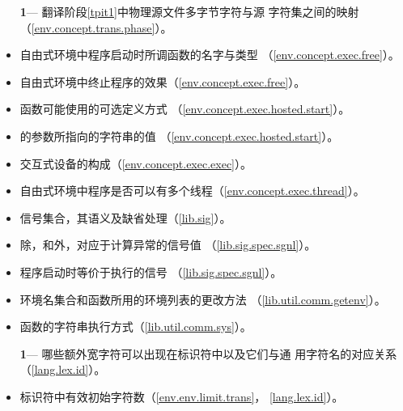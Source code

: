 \begin{itemize} %
  \item[\textbf{1}\hspace{5pt}---]{翻译阶段\ref{tpit1}中物理源文件多字节字符与源
    字符集之间的映射（\ref{env.concept.trans.phase}）。}
  \item{自由式环境中程序启动时所调函数的名字与类型
    （\ref{env.concept.exec.free}）。}
  \item{自由式环境中终止程序的效果（\ref{env.concept.exec.free}）。}
  \item{函数可能使用的可选定义方式
    （\ref{env.concept.exec.hosted.start}）。}
  \item{的参数所指向的字符串的值
    （\ref{env.concept.exec.hosted.start}）。}
  \item{交互式设备的构成（\ref{env.concept.exec.exec}）。}
  \item{自由式环境中程序是否可以有多个线程（\ref{env.concept.exec.thread}）。}
  \item{信号集合，其语义及缺省处理（\ref{lib.sig}）。}
  \item{除，和外，对应于计算异常的信号值
    （\ref{lib.sig.spec.sgnl}）。}
  \item{程序启动时等价于执行的信号
    （\ref{lib.sig.spec.sgnl}）。}
  \item{环境名集合和函数所用的环境列表的更改方法
    （\ref{lib.util.comm.getenv}）。}
  \item{函数的字符串执行方式（\ref{lib.util.comm.sys}）。}
\end{itemize}

\begin{itemize} %
  \item[\textbf{1}\hspace{5pt}---]{哪些额外宽字符可以出现在标识符中以及它们与通
    用字符名的对应关系（\ref{lang.lex.id}）。}
  \item{标识符中有效初始字符数（\ref{env.env.limit.trans}，
    \ref{lang.lex.id}）。}
\end{itemize}

